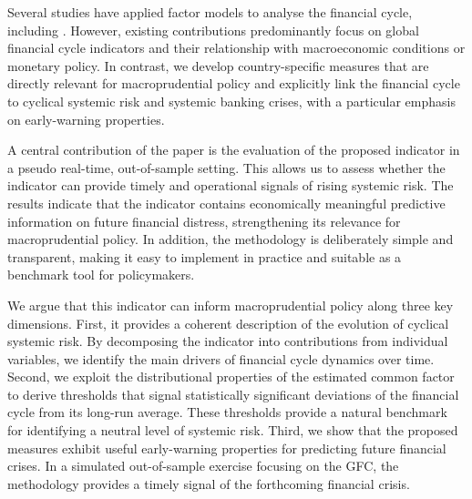 Several studies have applied factor models to analyse the financial cycle, including \cite{jorg2016analyzing, menden2017dissecting, miranda2020us}. However, existing contributions predominantly focus on global financial cycle indicators and their relationship with macroeconomic conditions or monetary policy. In contrast, we develop country-specific measures that are directly relevant for macroprudential policy and explicitly link the financial cycle to cyclical systemic risk and systemic banking crises, with a particular emphasis on early-warning properties.

A central contribution of the paper is the evaluation of the proposed indicator in a pseudo real-time, out-of-sample setting. This allows us to assess whether the indicator can provide timely and operational signals of rising systemic risk. The results indicate that the indicator contains economically meaningful predictive information on future financial distress, strengthening its relevance for macroprudential policy. In addition, the methodology is deliberately simple and transparent, making it easy to implement in practice and suitable as a benchmark tool for policymakers.

We argue that this indicator can inform macroprudential policy along three key dimensions. First, it provides a coherent description of the evolution of cyclical systemic risk. By decomposing the indicator into contributions from individual variables, we identify the main drivers of financial cycle dynamics over time. Second, we exploit the distributional properties of the estimated common factor to derive thresholds that signal statistically significant deviations of the financial cycle from its long-run average. These thresholds provide a natural benchmark for identifying a neutral level of systemic risk. Third, we show that the proposed measures exhibit useful early-warning properties for predicting future financial crises. In a simulated out-of-sample exercise focusing on the GFC, the methodology provides a timely signal of the forthcoming financial crisis.

